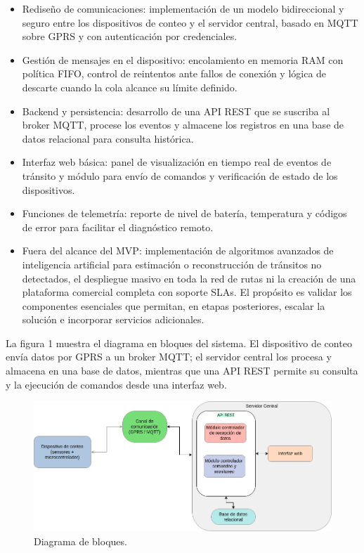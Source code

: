 \begin{itemize}

\item Rediseño de comunicaciones: implementación de un modelo bidireccional y seguro entre los dispositivos de conteo y el servidor central, basado en MQTT sobre GPRS y con autenticación por credenciales.

\item Gestión de mensajes en el dispositivo: encolamiento en memoria RAM con política FIFO, control de reintentos ante fallos de conexión y lógica de descarte cuando la cola alcance su límite definido.

\item Backend y persistencia: desarrollo de una API REST que se suscriba al broker MQTT, procese los eventos y almacene los registros en una base de datos relacional para consulta histórica.

\item Interfaz web básica: panel de visualización en tiempo real de eventos de tránsito y módulo para envío de comandos y verificación de estado de los dispositivos.

\item Funciones de telemetría: reporte de nivel de batería, temperatura y códigos de error para facilitar el diagnóstico remoto.

\item  Fuera del alcance del MVP: implementación de algoritmos avanzados de inteligencia artificial para estimación o reconstrucción de tránsitos no detectados, el despliegue masivo en toda la red de rutas ni la creación de una plataforma comercial completa con soporte SLAs. El propósito es validar los componentes esenciales que permitan, en etapas posteriores, escalar la solución e incorporar servicios adicionales.
\end{itemize}

La figura 1 muestra el diagrama en bloques del sistema. El dispositivo de conteo envía datos por GPRS a un broker MQTT; el servidor central los procesa y almacena en una base de datos, mientras que una API REST permite su consulta y la ejecución de comandos desde una interfaz web.

\vspace{1cm}

\begin{figure}[htbp]
	\centering
	\includegraphics[width=.98\textwidth]{./Figures/diagBloques.png}
	\caption{Diagrama de bloques.}
	\label{fig:texmaker}
\end{figure}

\vspace{1cm}











